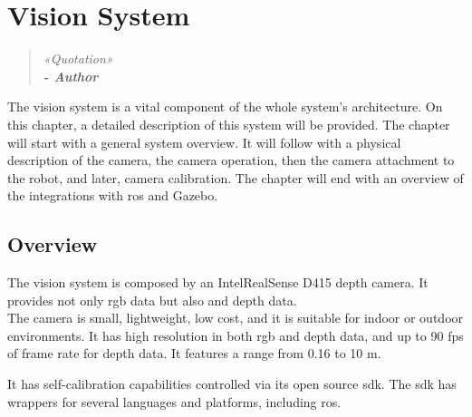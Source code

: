 \chapter{Vision System}
\label{cha:vision_system}

\begin{quotation}
\begin{flushright}
\itshape
«Quotation»\\
\textbf{- Author}
\end{flushright}
\end{quotation}

The vision system is a vital component of the whole system's architecture. On this chapter, a detailed description of this system will be provided. The chapter will start with a general system overview. It will follow with a physical description of the camera, the camera operation, then the camera attachment to the robot, and later, camera calibration. The chapter will end with an overview of the integrations with \gls{ros} and Gazebo.


\section{Overview}
\label{sec:vision_system_overview}

The vision system is composed by an Intel\textregistered RealSense\texttrademark{} D415 depth camera. It provides not only \gls{rgb} data but also  and depth data.\\

The camera is small, lightweight, low cost, and it is suitable for indoor or outdoor environments. It has high resolution in both \gls{rgb} and depth data, and up to 90 \gls{fps} of frame rate for depth data. It features a range from 0.16 to 10 \si{\meter}.

It has self-calibration capabilities controlled via its open source \gls{sdk}. The \gls{sdk} has wrappers for several languages and platforms, including \gls{ros}.



